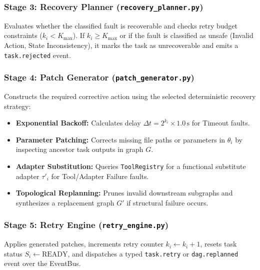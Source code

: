 \documentclass[conference]{IEEEtran}
\begin{document}
\subsubsection{Stage 3: Recovery Planner (\texttt{recovery\_planner.py})}
Evaluates whether the classified fault is recoverable and checks retry budget constraints ($k_i < K_{\text{max}}$). If $k_i \ge K_{\text{max}}$ or if the fault is classified as unsafe (Invalid Action, State Inconsistency), it marks the task as unrecoverable and emits a \texttt{task.rejected} event.

\subsubsection{Stage 4: Patch Generator (\texttt{patch\_generator.py})}
Constructs the required corrective action using the selected deterministic recovery strategy:
\begin{itemize}
    \item \textbf{Exponential Backoff:} Calculates delay $\Delta t = 2^{k_i} \times 1.0\,\text{s}$ for Timeout faults.
    \item \textbf{Parameter Patching:} Corrects missing file paths or parameters in $\theta_i$ by inspecting ancestor task outputs in graph $G$.
    \item \textbf{Adapter Substitution:} Queries \texttt{ToolRegistry} for a functional substitute adapter $\tau'_i$ for Tool/Adapter Failure faults.
    \item \textbf{Topological Replanning:} Prunes invalid downstream subgraphs and synthesizes a replacement graph $G'$ if structural failure occurs.
\end{itemize}

\subsubsection{Stage 5: Retry Engine (\texttt{retry\_engine.py})}
Applies generated patches, increments retry counter $k_i \leftarrow k_i + 1$, resets task status $S_i \leftarrow \text{READY}$, and dispatches a typed \texttt{task.retry} or \texttt{dag.replanned} event over the EventBus.
\end{document}
